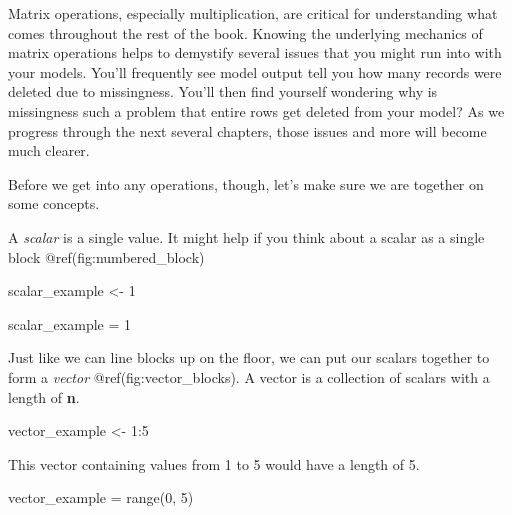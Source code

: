 \documentclass[
  letterpaper,
]{krantz}
\newenvironment{Shaded}{}{}
\newcommand{\BuiltInTok}[1]{\textcolor[rgb]{0.00,0.50,0.00}{#1}}
\newcommand{\DecValTok}[1]{\textcolor[rgb]{0.25,0.63,0.44}{#1}}
\newcommand{\NormalTok}[1]{#1}
\newcommand{\OperatorTok}[1]{\textcolor[rgb]{0.40,0.40,0.40}{#1}}
\newcommand{\OtherTok}[1]{\textcolor[rgb]{0.00,0.44,0.13}{#1}}
\newcommand{\SpecialCharTok}[1]{\textcolor[rgb]{0.25,0.44,0.63}{#1}}
\begin{document}
Matrix operations, especially multiplication, are critical for
understanding what comes throughout the rest of the book. Knowing the
underlying mechanics of matrix operations helps to demystify several
issues that you might run into with your models. You'll frequently see
model output tell you how many records were deleted due to missingness.
You'll then find yourself wondering why is missingness such a problem
that entire rows get deleted from your model? As we progress through the
next several chapters, those issues and more will become much clearer.

Before we get into any operations, though, let's make sure we are
together on some concepts.

A \emph{scalar} is a single value. It might help if you think about a
scalar as a single block @ref(fig:numbered\_block)

\begin{Shaded}
\begin{Highlighting}[]
\NormalTok{scalar\_example }\OtherTok{\textless{}{-}} \DecValTok{1}
\end{Highlighting}
\end{Shaded}

\begin{Shaded}
\begin{Highlighting}[]
\NormalTok{scalar\_example }\OperatorTok{=} \DecValTok{1}
\end{Highlighting}
\end{Shaded}

Just like we can line blocks up on the floor, we can put our scalars
together to form a \emph{vector} @ref(fig:vector\_blocks). A vector is a
collection of scalars with a length of \textbf{n}.

\begin{Shaded}
\begin{Highlighting}[]
\NormalTok{vector\_example }\OtherTok{\textless{}{-}} \DecValTok{1}\SpecialCharTok{:}\DecValTok{5}
\end{Highlighting}
\end{Shaded}

This vector containing values from 1 to 5 would have a length of 5.

\begin{Shaded}
\begin{Highlighting}[]
\NormalTok{vector\_example }\OperatorTok{=} \BuiltInTok{range}\NormalTok{(}\DecValTok{0}\NormalTok{, }\DecValTok{5}\NormalTok{)}
\end{Highlighting}
\end{Shaded}
\end{document}
